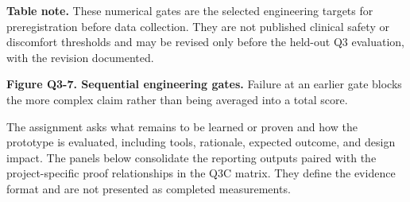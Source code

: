 \vspace{0.4em}
{\fontsize{8.25}{9.55}\selectfont\color{AUBGray}
\textbf{Table note.} These numerical gates are the selected engineering
targets for preregistration before data collection. They are not published
clinical safety or discomfort thresholds and may be revised only before the
held-out Q3 evaluation, with the revision documented.\par}

\vspace{0.35em}
\begin{center}
\end{center}
{\fontsize{7.5}{8.7}\selectfont\color{AUBGray}
\textbf{Figure Q3-7. Sequential engineering gates.} Failure at an earlier
gate blocks the more complex claim rather than being averaged into a total
score.\par}

\clearpage
{}

\hypertarget{q3-validation-outputs}{}

{\fontsize{9.25}{10.95}\selectfont
The assignment asks what remains to be learned or proven and how the prototype
is evaluated, including tools, rationale, expected outcome, and design impact.
The panels below consolidate the reporting outputs paired with the
project-specific proof relationships in the Q3C matrix. They define the
evidence format and are not presented as completed measurements.\par}

